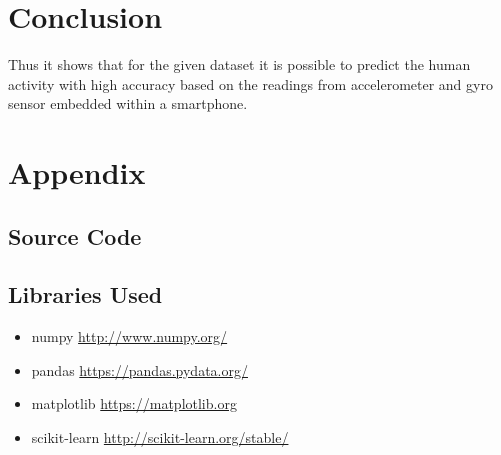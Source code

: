 \documentclass[12pt]{article}
\begin{document}
\section{Conclusion}
Thus it shows that for the given dataset it is possible to predict the human activity with high accuracy based on the readings from accelerometer and gyro sensor embedded
within a smartphone.

\newpage


\newpage

\section*{Appendix}

\subsection{Source Code}


\subsection{Libraries Used}

\begin{itemize}
    \item numpy \url{http://www.numpy.org/}
    \item pandas \url{https://pandas.pydata.org/}
    \item matplotlib \url{https://matplotlib.org}
    \item scikit-learn \url{http://scikit-learn.org/stable/}
\end{itemize}
\end{document}
